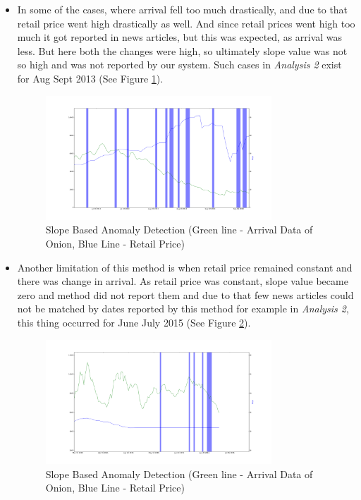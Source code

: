 \documentclass[a4paper,10pt]{report}
\begin{document}
\begin{itemize}
			\item In some of the cases, where arrival fell too much drastically, and due to that retail price went high drastically as well. And since retail prices went high too much it got reported in news articles, but this was expected, as arrival was less. But here both the changes were high, so ultimately slope value was not so high and was not reported by our system. Such cases in \textit{Analysis 2} exist for Aug Sept 2013  (See Figure \ref{fig:12125}).
			
			\begin{figure}[H]
		    	\centering
  		    	\includegraphics[width=0.8\textwidth]{graphs/12125.png}
		    	\caption{Slope Based Anomaly Detection (Green line - Arrival Data of Onion, Blue Line - Retail Price)}
		    	\label{fig:12125}
			\end{figure}
			
			\item Another limitation of this method is when retail price remained constant and there was change in arrival. As retail price was constant, slope value became zero and method did not report them and due to that few news articles could not be matched by dates reported by this method for example in \textit{Analysis 2}, this thing occurred for June July 2015  (See Figure \ref{fig:12126}).
			
			\begin{figure}[H]
		    	\centering
  		    	\includegraphics[width=0.8\textwidth]{graphs/12126.png}
		    	\caption{Slope Based Anomaly Detection (Green line - Arrival Data of Onion, Blue Line - Retail Price)}
		    	\label{fig:12126}
			\end{figure}
			
		\end{itemize}
\end{document}
